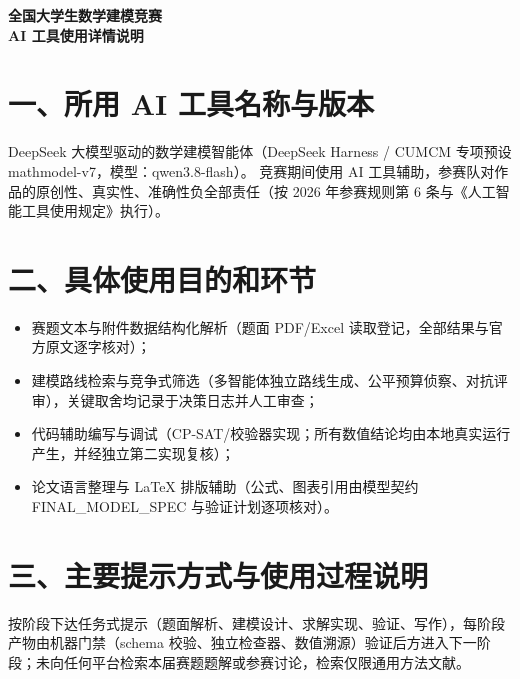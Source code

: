 \documentclass[12pt]{article}
\begin{document}
\begin{center}{\Large\bfseries 全国大学生数学建模竞赛\\[2mm] AI 工具使用详情说明}\end{center}
\section*{一、所用 AI 工具名称与版本}
DeepSeek 大模型驱动的数学建模智能体（DeepSeek Harness / CUMCM 专项预设 mathmodel-v7，模型：qwen3.8-flash）。
竞赛期间使用 AI 工具辅助，参赛队对作品的原创性、真实性、准确性负全部责任（按 2026 年参赛规则第 6 条与《人工智能工具使用规定》执行）。

\section*{二、具体使用目的和环节}
\begin{itemize}[leftmargin=2em]
\item 赛题文本与附件数据结构化解析（题面 PDF/Excel 读取登记，全部结果与官方原文逐字核对）；
\item 建模路线检索与竞争式筛选（多智能体独立路线生成、公平预算侦察、对抗评审），关键取舍均记录于决策日志并人工审查；
\item 代码辅助编写与调试（CP-SAT/校验器实现；所有数值结论均由本地真实运行产生，并经独立第二实现复核）；
\item 论文语言整理与 LaTeX 排版辅助（公式、图表引用由模型契约 FINAL\_MODEL\_SPEC 与验证计划逐项核对）。
\end{itemize}

\section*{三、主要提示方式与使用过程说明}
按阶段下达任务式提示（题面解析、建模设计、求解实现、验证、写作），每阶段产物由机器门禁（schema 校验、独立检查器、数值溯源）验证后方进入下一阶段；未向任何平台检索本届赛题题解或参赛讨论，检索仅限通用方法文献。
\end{document}
